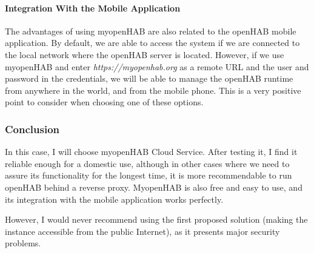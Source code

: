 \paragraph{Integration With the Mobile Application} The advantages of using myopenHAB are also related to the openHAB mobile application.
By default, we are able to access the system if we are connected to the local network where the openHAB server is located. However,
if we use myopenHAB and enter \textit{https://myopenhab.org} as a remote URL and the user and password in the credentials, we will
be able to manage the openHAB runtime from anywhere in the world, and from the mobile phone. This is a very positive point to 
consider when choosing one of these options.

\subsubsection{Conclusion}
In this case, I will choose myopenHAB Cloud Service. After testing it, I find it reliable enough for a domestic use, although in 
other cases where we need to assure its functionality for the longest time, it is more recommendable to run openHAB behind a reverse 
proxy. MyopenHAB is also free and easy to use, and its integration with the mobile application works perfectly.

However, I would never recommend using the first proposed solution (making the instance accessible from the public Internet), as 
it presents major security problems.

